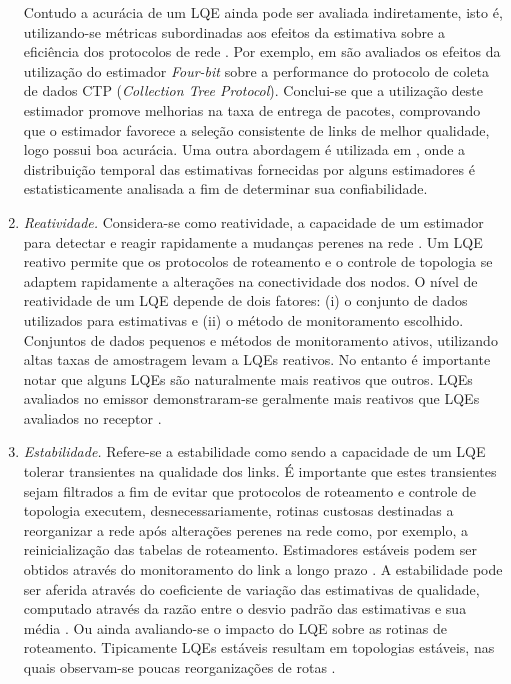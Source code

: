 \documentclass[
	12pt,				%
	openright,			%
	oneside,
	a4paper,			%
	english,			%
	french,				%
	spanish,			%
	brazil				%
	]{abntex2}
\begin{document}
\begin{enumerate}
	Contudo a acurácia de um LQE ainda pode ser avaliada indiretamente, isto é, utilizando-se métricas subordinadas aos efeitos da estimativa sobre a eficiência dos protocolos de rede \cite{Baccour2012}. Por exemplo, em  são avaliados os efeitos da utilização do estimador \textit{Four-bit} sobre a performance do protocolo de coleta de dados CTP (\textit{Collection Tree Protocol}). Conclui-se que a utilização deste estimador promove melhorias na taxa de entrega de pacotes, comprovando que o estimador favorece a seleção consistente de links de melhor qualidade, logo possui boa acurácia. Uma outra abordagem é utilizada em , onde a distribuição temporal das estimativas fornecidas por alguns estimadores é estatisticamente analisada a fim de determinar sua confiabilidade.
	\item \textit{Reatividade.} Considera-se como reatividade, a capacidade de um estimador para detectar e reagir rapidamente a mudanças perenes na rede \cite{KimM.2001}. Um LQE reativo permite que os protocolos de roteamento e o controle de topologia se adaptem rapidamente a alterações na conectividade dos nodos. O nível de reatividade de um LQE depende de dois fatores: (i) o conjunto de dados utilizados para estimativas e (ii) o método de monitoramento escolhido. Conjuntos de dados pequenos e métodos de monitoramento ativos, utilizando altas taxas de amostragem levam a LQEs reativos. No entanto é importante notar que alguns LQEs são naturalmente mais reativos que outros. LQEs avaliados no emissor demonstraram-se geralmente mais reativos que LQEs avaliados no receptor \cite{Baccour2011}.
	\item \textit{Estabilidade.} Refere-se a estabilidade como sendo a capacidade de um LQE tolerar transientes na qualidade dos links. É importante que estes transientes sejam filtrados a fim de evitar que protocolos de roteamento e controle de topologia executem, desnecessariamente, rotinas custosas destinadas a reorganizar a rede após alterações perenes na rede como, por exemplo, a reinicialização das  tabelas de roteamento. Estimadores estáveis podem ser obtidos através do monitoramento do link a longo prazo \cite{Lin2009}. A estabilidade pode ser aferida através do coeficiente de variação das estimativas de qualidade, computado através da razão entre o desvio padrão das estimativas e sua média \cite{Woo2003}. Ou ainda avaliando-se o impacto do LQE sobre as rotinas de roteamento. Tipicamente LQEs estáveis resultam em topologias estáveis, nas quais observam-se poucas reorganizações de rotas \cite{Baccour2009}.
\end{enumerate}
\end{document}
